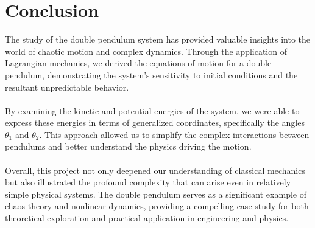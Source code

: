 \documentclass{article}
\begin{document}
\section{Conclusion}
The study of the double pendulum system has provided valuable insights into the world of chaotic motion and complex dynamics. Through the application of Lagrangian mechanics, we derived the equations of motion for a double pendulum, demonstrating the system's sensitivity to initial conditions and the resultant unpredictable behavior.
\\\\
By examining the kinetic and potential energies of the system, we were able to express these energies in terms of generalized coordinates, specifically the angles \(\theta_1\) and \(\theta_2\). This approach allowed us to simplify the complex interactions between pendulums and better understand the physics driving the motion.
\\\\
Overall, this project not only deepened our understanding of classical mechanics but also illustrated the profound complexity that can arise even in relatively simple physical systems. The double pendulum serves as a significant example of chaos theory and nonlinear dynamics, providing a compelling case study for both theoretical exploration and practical application in engineering and physics.
\end{document}
